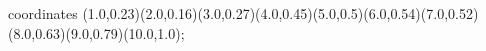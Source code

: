 					coordinates { (1.0,0.23)(2.0,0.16)(3.0,0.27)(4.0,0.45)(5.0,0.5)(6.0,0.54)(7.0,0.52)(8.0,0.63)(9.0,0.79)(10.0,1.0)};